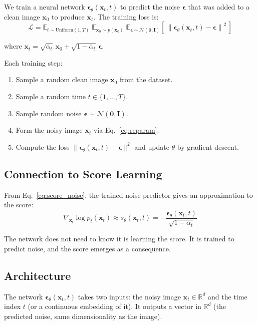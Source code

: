 \documentclass[11pt]{article}
\newcommand{\xb}{\mathbf{x}}
\newcommand{\eb}{\boldsymbol{\epsilon}}
\newcommand{\Ib}{\mathbf{I}}
\newcommand{\R}{\mathbb{R}}
\newcommand{\E}{\mathbb{E}}
\newcommand{\alphabar}{\bar{\alpha}}
\begin{document}
  We train a neural network $\eb_\theta(\xb_t, t)$ to predict the noise
  $\eb$ that was added to a clean image $\xb_0$ to produce $\xb_t$.
  The training loss is:
  \begin{equation}
      \mathcal{L} = \E_{t \sim \mathrm{Uniform}(1,T)} \;
          \E_{\xb_0 \sim p(\xb_0)} \;
          \E_{\eb \sim \mathcal{N}(\mathbf{0}, \Ib)}
          \left[\,
              \left\| \eb_\theta(\xb_t, t) - \eb \right\|^2
          \,\right]
      \label{eq:training_loss}
  \end{equation}

  where $\xb_t = \sqrt{\alphabar_t}\, \xb_0 + \sqrt{1 - \alphabar_t}\, \eb$.

  Each training step:
  \begin{enumerate}[nosep]
      \item Sample a random clean image $\xb_0$ from the dataset.
      \item Sample a random time $t \in \{1, \ldots, T\}$.
      \item Sample random noise $\eb \sim \mathcal{N}(\mathbf{0}, \Ib)$.
      \item Form the noisy image $\xb_t$ via Eq.~\eqref{eq:reparam}.
      \item Compute the loss $\|\eb_\theta(\xb_t, t) - \eb\|^2$ and
            update $\theta$ by gradient descent.
  \end{enumerate}

  \subsection{Connection to Score Learning}

  From Eq.~\eqref{eq:score_noise}, the trained noise predictor gives an
  approximation to the score:
  \begin{equation}
      \nabla_{\xb_t} \log p_t(\xb_t)
      \approx s_\theta(\xb_t, t)
      = -\frac{\eb_\theta(\xb_t, t)}{\sqrt{1 - \alphabar_t}}
      \label{eq:score_from_eps}
  \end{equation}

  The network does not need to know it is learning the score. It is trained
  to predict noise, and the score emerges as a consequence.

  \subsection{Architecture}

  The network $\eb_\theta(\xb_t, t)$ takes two inputs: the noisy image
  $\xb_t \in \R^d$ and the time index $t$ (or a continuous embedding of it).
  It outputs a vector in $\R^d$ (the predicted noise, same dimensionality
  as the image).
\end{document}
